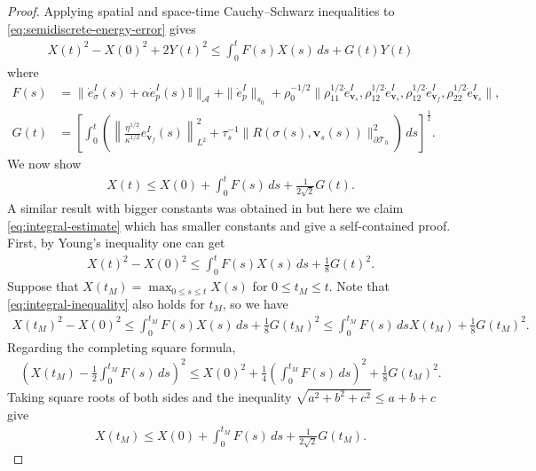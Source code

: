 \documentclass[10pt,letterpaper]{amsart}
\theoremstyle{plain} %
\theoremstyle{remark} %
\newcommand{\vect}[1]{\mathbf{#1}}
\newcommand{\Id}{\mathbb{I}} %
\newcommand{\Ael}{\mathcal{A}} %
\begin{document}
\begin{proof}
	Applying spatial and space-time Cauchy--Schwarz inequalities to \eqref{eq:semidiscrete-energy-error} gives
	\begin{align*}
		X(t)^2 - X(0)^2 + 2 Y(t)^2 \le \int_0^t F(s) X(s)\,ds + G(t) Y(t) 
	\end{align*}
	where 
	\begin{align*}
		F(s) &= \|\dot{e}_{\sigma}^{I}(s) + \alpha \dot{e}_{p}^{I}(s) \Id\|_{\Ael} + \|\dot{e}_p^I\|_{s_0} + \rho_0^{-1/2} \| \rho_{11}^{1/2} \dot{e}_{\vect{v}_{s}}^I, \rho_{12}^{1/2} \dot{e}_{\vect{v}_{s}}^I, \rho_{12}^{1/2} \dot{e}_{\vect{v}_{f}}^I, \rho_{22}^{1/2} \dot{e}_{\vect{v}_{s}}^I\| , 
		\\
		G(t) &= \left[\int_0^t \left(\left\| \frac{\eta^{1/2}}{\kappa^{1/2}} e_{\vect{v}_{f}}^I (s) \right\|_{L^2}^2  + \tau_{s}^{-1}\| R(\sigma(s), \vect{v}_{s}(s)) \|_{\partial \mathcal{T}_h}^2 \right) \,ds\right]^{\frac 12} .
	\end{align*}
	We now show  
		\begin{align}
			\label{eq:integral-estimate}
			X(t) \le X(0) + \int_0^t F(s) \,ds + \frac{1}{2\sqrt{2}} G(t) .
		\end{align}
		A similar result with bigger constants was obtained in \cite[Lemma~1]{Lee:2016} but here we claim \eqref{eq:integral-estimate} which has smaller constants and give a self-contained proof. First, by Young's inequality one can get 
		\begin{align}
			\label{eq:integral-inequality}
			X(t)^2 - X(0)^2 \le \int_0^t F(s) X(s)\,ds + \frac 18 G(t)^2 .
		\end{align}
		Suppose that $X(t_M) = \max_{0\le s\le t} X(s)$ for $0\le t_M \le t$. Note that \eqref{eq:integral-inequality} also holds for $t_M$, so we have 
		\begin{align*}
			X(t_M)^2 - X(0)^2 \le \int_0^{t_M} F(s) X(s) \,ds + \frac 18 G(t_M)^2 \le \int_0^{t_M} F(s) \,ds X(t_M) + \frac 18 G(t_M)^2 .
		\end{align*}
		Regarding the completing square formula, 
		\begin{align*}
			\left( X(t_M) - \frac 12 \int_0^{t_M} F(s)\,ds \right)^2 \le X(0)^2 + \frac 14 \left(\int_0^{t_M} F(s)\,ds\right)^2 + \frac 18 G(t_M)^2 .
		\end{align*}
		Taking square roots of both sides and the inequality $\sqrt{a^2 + b^2 + c^2} \le a + b + c$ give 
		\begin{align*}
			X(t_M) \le X(0) + \int_0^{t_M} F(s)\,ds + \frac 1{2\sqrt{2}} G(t_M) .
		\end{align*}

\end{proof}
\end{document}

